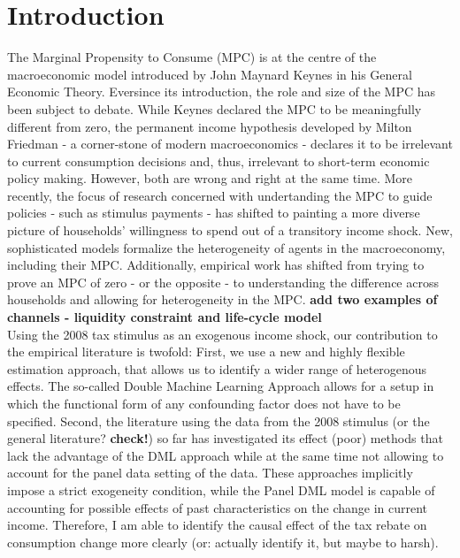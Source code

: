 \section{Introduction} \label{sec:intro}
The Marginal Propensity to Consume (MPC) is at the centre of the macroeconomic model introduced by John Maynard Keynes in his General Economic Theory. Eversince its introduction, the role and size of the MPC has been subject to debate. While Keynes declared the MPC to be meaningfully different from zero, the permanent income hypothesis developed by Milton Friedman - a corner-stone of modern macroeconomics - declares it to be irrelevant to current consumption decisions and, thus, irrelevant to short-term economic policy making. However, both are wrong and right at the same time. More recently, the focus of research concerned with undertanding the MPC to guide policies - such as stimulus payments - has shifted to painting a more diverse picture of households' willingness to spend out of a transitory income shock. New, sophisticated models formalize the heterogeneity of agents in the macroeconomy, including their MPC. Additionally, empirical work has shifted from trying to prove an MPC of zero - or the opposite - to understanding the difference across households and allowing for heterogeneity in the MPC. \textbf{add two examples of channels - liquidity constraint and life-cycle model} \\
Using the 2008 tax stimulus as an exogenous income shock, our contribution to the empirical literature is twofold: First, we use a new and highly flexible estimation approach, that allows us to identify a wider range of heterogenous effects. The so-called Double Machine Learning Approach allows for a setup in which the functional form of any confounding factor does not have to be specified. Second, the literature using the data from the 2008 stimulus (or the general literature? \textbf{check!}) so far has investigated its effect (poor) methods that lack the advantage of the DML approach while at the same time not allowing to account for the panel data setting of the data. These approaches implicitly impose a strict exogeneity condition, while the Panel DML model is capable of accounting for possible effects of past characteristics on the change in current income. Therefore, I am able to identify the causal effect of the tax rebate on consumption change more clearly (or: actually identify it, but maybe to harsh). \\
